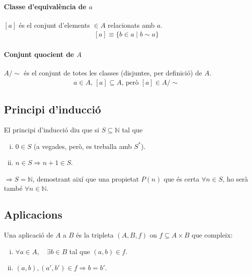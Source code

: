 \paragraph{Classe d'equivalència de $a$}
$\left[ a \right]$ és el conjunt d'elements $\in A$ relacionats amb $a$.
\begin{align}
    \left[ a \right] \equiv \{b \in a \mid b \sim a \} 
\end{align}

\paragraph{Conjunt quocient de $A$}
 $A / \sim$ és el conjunt de totes les classes (disjuntes, per definició) de $A$. 
\begin{align}
    a \in A \textrm{, } \left[ a \right] \subseteq A \textrm{, però } \left[ a \right] \in A / \sim
\end{align}

\subsection{Principi d'inducció}
El principi d'inducció diu que si $S \subseteq \mathbb{N}$ tal que
\begin{enumerate}[i)]
    \item $0 \in S$ (a vegades, però, es treballa amb $S^{*} $).
    \item $n \in S \Rightarrow n+1 \in S$.
\end{enumerate}

$\Rightarrow S = \mathbb{N}$, demostrant així que una propietat $P(n)$ que és certa $\forall n \in S$, ho serà també $\forall n \in \mathbb{N}$.

\subsection{Aplicacions}
Una aplicació de $A$ a $B$ és la tripleta $(A,B,f)$ on $f \subseteq A \times B$ que compleix:
\begin{enumerate}[i)]
    \item $\forall a \in A, \quad \exists b \in B$ tal que $(a,b) \in f$. 
    \item $(a,b),(a',b') \in f \Rightarrow b = b'$.
\end{enumerate}

